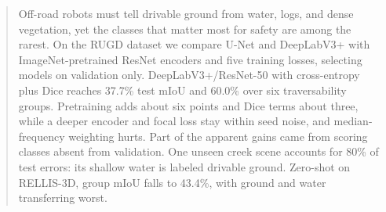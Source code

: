 \begin{abstract}
Off-road robots must tell drivable ground from water, logs, and dense
vegetation, yet the classes that matter most for safety are among the rarest.
On the RUGD dataset we compare U-Net and DeepLabV3+ with ImageNet-pretrained
ResNet encoders and five training losses, selecting models on validation
only. DeepLabV3+/ResNet-50 with cross-entropy plus Dice reaches 37.7\% test
mIoU and 60.0\% over six traversability groups. Pretraining adds about six
points and Dice terms about three, while a deeper encoder and focal loss stay
within seed noise, and median-frequency weighting hurts. Part of the apparent
gains came from scoring classes absent from validation. One unseen creek
scene accounts for 80\% of test errors: its shallow water is labeled
drivable ground. Zero-shot on RELLIS-3D, group mIoU falls to 43.4\%, with
ground and water transferring worst.
\end{abstract}
